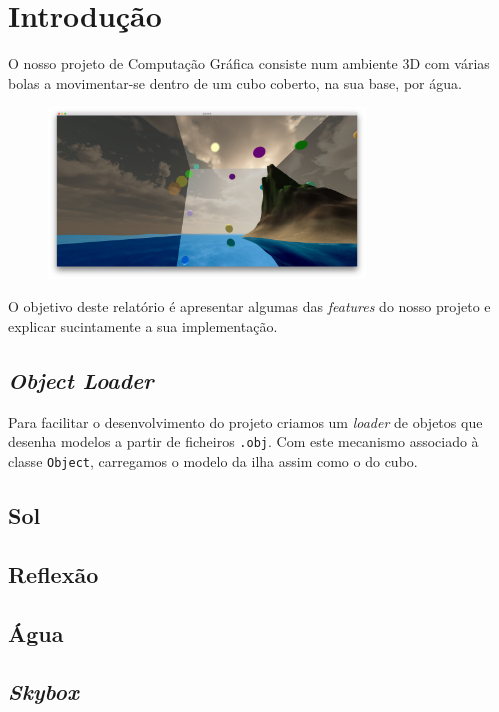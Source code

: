 \documentclass[12pt]{article}
\title{\TitleFont{Computação Gráfica}}
\author{David Gomes (2013136061) \and \vspace{-0.1cm} André Baptista (2013136742)}
\date{}
\begin{document}
\maketitle

\section*{Introdução}
O nosso projeto de Computação Gráfica consiste num ambiente 3D com várias bolas a movimentar-se
dentro de um cubo coberto, na sua base, por água.

\begin{figure}[H]
  \centering
  \includegraphics[width=0.75\textwidth]{screenshot}
\end{figure}

O objetivo deste relatório é apresentar algumas das \textit{features} do nosso projeto e explicar sucintamente a sua implementação.

\pagebreak

\subsection*{\textit{Object Loader}}
Para facilitar o desenvolvimento do projeto criamos um \textit{loader} de objetos que desenha modelos
a partir de ficheiros \texttt{.obj}. Com este mecanismo associado à classe \texttt{Object}, carregamos o modelo da ilha assim como o do cubo.
\subsection*{Sol}
\subsection*{Reflexão}
\subsection*{Água}
\subsection*{\textit{Skybox}}
\end{document}
